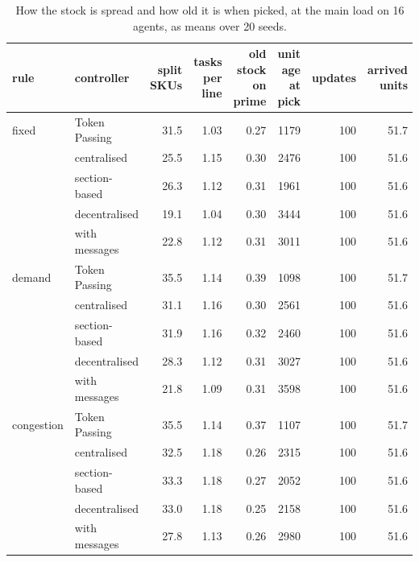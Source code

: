 \documentclass[11pt,a4paper]{article}
\newcommand{\new}[1]{\textcolor{newc}{#1}}
\begin{document}
\begin{table}[h]
  \centering
  \small
  \setlength{\tabcolsep}{4pt}
  \caption{\new{How the stock is spread and how old it is when picked, at the main load on 16 agents, as means over 20 seeds.}}
  \label{tab:app:stock:16}
  \begin{tabular}{llrrrrrr}
    \toprule
    rule  &  controller  &  \shortstack{split\\SKUs}  &  \shortstack{tasks\\per line}  &  \shortstack{old stock\\on prime}  &  \shortstack{unit age\\at pick}  &  updates  &  \shortstack{arrived\\units} \\
    \midrule
    fixed      & Token Passing  & 31.5 & 1.03 & 0.27 & 1179 & 100 & 51.7 \\
               & centralised    & 25.5 & 1.15 & 0.30 & 2476 & 100 & 51.6 \\
               & section-based  & 26.3 & 1.12 & 0.31 & 1961 & 100 & 51.6 \\
               & decentralised  & 19.1 & 1.04 & 0.30 & 3444 & 100 & 51.6 \\
               & with messages  & 22.8 & 1.12 & 0.31 & 3011 & 100 & 51.6 \\
    demand     & Token Passing  & 35.5 & 1.14 & 0.39 & 1098 & 100 & 51.7 \\
               & centralised    & 31.1 & 1.16 & 0.30 & 2561 & 100 & 51.6 \\
               & section-based  & 31.9 & 1.16 & 0.32 & 2460 & 100 & 51.6 \\
               & decentralised  & 28.3 & 1.12 & 0.31 & 3027 & 100 & 51.6 \\
               & with messages  & 21.8 & 1.09 & 0.31 & 3598 & 100 & 51.6 \\
    congestion & Token Passing  & 35.5 & 1.14 & 0.37 & 1107 & 100 & 51.7 \\
               & centralised    & 32.5 & 1.18 & 0.26 & 2315 & 100 & 51.6 \\
               & section-based  & 33.3 & 1.18 & 0.27 & 2052 & 100 & 51.6 \\
               & decentralised  & 33.0 & 1.18 & 0.25 & 2158 & 100 & 51.6 \\
               & with messages  & 27.8 & 1.13 & 0.26 & 2980 & 100 & 51.6 \\
    \bottomrule
  \end{tabular}
\end{table}
\end{document}
